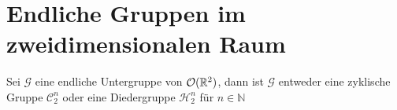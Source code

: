 \section{Endliche Gruppen im zweidimensionalen Raum}
\begin{theorem}
 Sei $\mathcal{G}$ eine endliche Untergruppe von ${\mathcal{O}(\mathbb{R}^2)}$, dann ist $\mathcal{G}$ entweder eine zyklische Gruppe $\mathcal{C}^n_2$ oder eine Diedergruppe $\mathcal{H}^n_2$ für $n \in \mathbb{N}$
\end{theorem}

